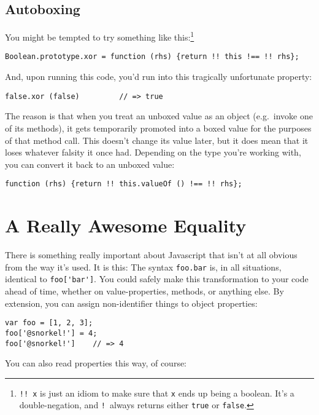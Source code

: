 \documentclass{article}
\begin{document}
\subsection {Autoboxing}
    \label{sec:autoboxing}
    You might be tempted to try something like this:\footnote{{\tt !!~x} is just an idiom to make sure that {\tt x} ends up being a boolean. It's a double-negation, and {\tt !}~always
    returns either {\tt true} or {\tt false}.}

\begin{verbatim}
Boolean.prototype.xor = function (rhs) {return !! this !== !! rhs};
\end{verbatim}

    And, upon running this code, you'd run into this tragically unfortunate property:

\begin{verbatim}
false.xor (false)         // => true
\end{verbatim}

    The reason is that when you treat an unboxed value as an object (e.g.~invoke one of its methods), it gets temporarily promoted into a boxed value for the purposes of that method call.
    This doesn't change its value later, but it does mean that it loses whatever falsity it once had. Depending on the type you're working with, you can convert it back to an unboxed value:

\begin{verbatim}
function (rhs) {return !! this.valueOf () !== !! rhs};
\end{verbatim}

\section {A Really Awesome Equality}
  \label{sec:a-really-awesome-equality}
  There is something really important about Javascript that isn't at all obvious from the way it's used. It is this: The syntax \verb|foo.bar| is, in all situations, identical to
  \verb|foo['bar']|. You could safely make this transformation to your code ahead of time, whether on value-properties, methods, or anything else. By extension, you can assign non-identifier
  things to object properties:

\begin{verbatim}
var foo = [1, 2, 3];
foo['@snorkel!'] = 4;
foo['@snorkel!']    // => 4
\end{verbatim}

  You can also read properties this way, of course:
\end{document}
